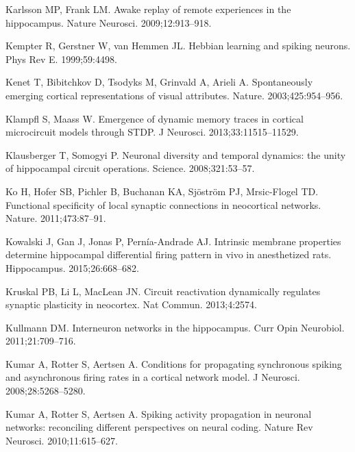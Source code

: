 \begin{thebibliography}{}
Karlsson MP, Frank LM.
\newblock Awake replay of remote experiences in the hippocampus.
\newblock Nature Neurosci. 2009;12:913--918.

Kempter R, Gerstner W, van Hemmen JL.
\newblock Hebbian learning and spiking neurons.
\newblock Phys Rev E. 1999;59:4498.

Kenet T, Bibitchkov D, Tsodyks M, Grinvald A, Arieli A.
\newblock Spontaneously emerging cortical representations of visual attributes.
\newblock Nature. 2003;425:954--956.

Klampfl S, Maass W.
\newblock Emergence of dynamic memory traces in cortical microcircuit models
  through STDP.
\newblock J Neurosci. 2013;33:11515--11529.

Klausberger T, Somogyi P. 
\newblock Neuronal diversity and temporal dynamics: the unity of hippocampal circuit operations.
\newblock Science. 2008;321:53--57.

Ko H, Hofer SB, Pichler B, Buchanan KA, Sj\"{o}str{\"o}m PJ, Mrsic-Flogel TD.
\newblock Functional specificity of local synaptic connections in neocortical
  networks.
\newblock Nature. 2011;473:87--91.


Kowalski J, Gan J, Jonas P, Pern{\'i}a-Andrade AJ.
\newblock Intrinsic membrane properties determine hippocampal differential firing pattern in vivo in anesthetized rats.
\newblock Hippocampus. 2015;26:668--682.

Kruskal PB, Li L, MacLean JN.
\newblock Circuit reactivation dynamically regulates synaptic plasticity in
  neocortex.
\newblock Nat Commun. 2013;4:2574.

Kullmann DM.
\newblock Interneuron networks in the hippocampus.
\newblock Curr Opin Neurobiol. 2011;21:709--716.

Kumar A, Rotter S, Aertsen A.
\newblock Conditions for propagating synchronous spiking and asynchronous
  firing rates in a cortical network model.
\newblock J Neurosci. 2008;28:5268--5280.

Kumar A, Rotter S, Aertsen A.
\newblock Spiking activity propagation in neuronal networks: reconciling different perspectives on neural coding.
\newblock Nature Rev Neurosci. 2010;11:615--627.


\end{thebibliography}
